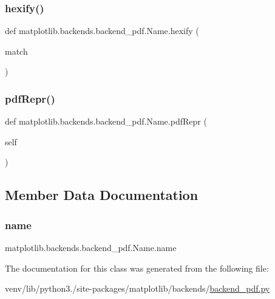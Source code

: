 \subsubsection{\texorpdfstring{hexify()}{hexify()}}
{\footnotesize\ttfamily def matplotlib.\+backends.\+backend\+\_\+pdf.\+Name.\+hexify (\begin{DoxyParamCaption}\item[{}]{match }\end{DoxyParamCaption})\hspace{0.3cm}{\ttfamily [static]}}

\mbox{\label{classmatplotlib_1_1backends_1_1backend__pdf_1_1Name_aeb7d4b039879746b9d1ef2f0f17f9abf}} 
\subsubsection{\texorpdfstring{pdf\+Repr()}{pdfRepr()}}
{\footnotesize\ttfamily def matplotlib.\+backends.\+backend\+\_\+pdf.\+Name.\+pdf\+Repr (\begin{DoxyParamCaption}\item[{}]{self }\end{DoxyParamCaption})}



\subsection{Member Data Documentation}
\mbox{\label{classmatplotlib_1_1backends_1_1backend__pdf_1_1Name_a0a02ac6ff39a6e16b4248faa9ddbf884}} 
\subsubsection{\texorpdfstring{name}{name}}
{\footnotesize\ttfamily matplotlib.\+backends.\+backend\+\_\+pdf.\+Name.\+name}



The documentation for this class was generated from the following file\+:\begin{DoxyCompactItemize}
\item 
venv/lib/python3./site-\/packages/matplotlib/backends/\hyperlink{backend__pdf_8py}{backend\+\_\+pdf.\+py}\end{DoxyCompactItemize}
